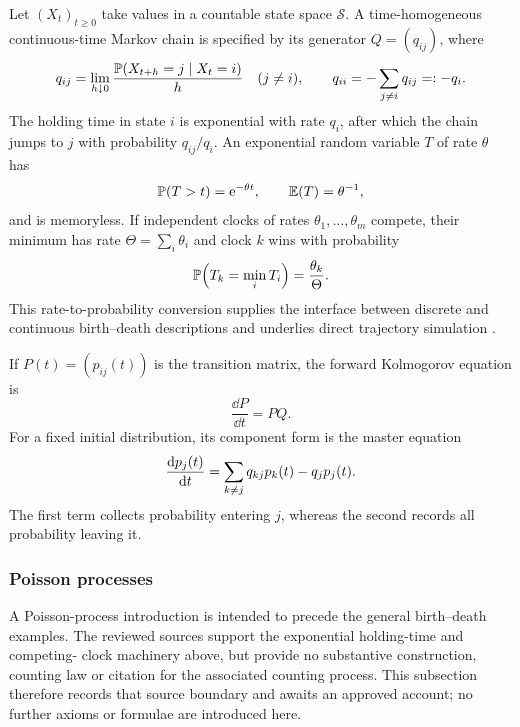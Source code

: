 Let $(X_t)_{t\geq0}$ take values in a countable state space $\mathcal S$.  A
time-homogeneous continuous-time Markov chain is specified by its generator
$Q=(q_{ij})$, where
\begin{equation}
  q_{ij}=\lim_{h\downarrow0}\frac{\mathbb{P}\!\left(X_{t+h}=j\mid X_t=i\right)}{h}
  \quad(j\neq i),\qquad
  q_{ii}=-\sum_{j\neq i}q_{ij}=:-q_i.
  \label{m:eq:generator}
\end{equation}
The holding time in state $i$ is exponential with rate $q_i$, after which the
chain jumps to $j$ with probability $q_{ij}/q_i$.  An exponential random variable
$T$ of rate $\theta$ has
\[
  \mathbb{P}\!\left(T>t\right)=\mathrm{e}^{-\theta t},\qquad \mathbb{E}\!\left(T\right)=\theta^{-1},
\]
and is memoryless.  If independent clocks of rates $\theta_1,\ldots,\theta_m$
compete, their minimum has rate $\Theta=\sum_i\theta_i$ and clock $k$ wins with
probability
\begin{equation}
  \mathbb{P}\!\left(T_k=\min_iT_i\right)=\frac{\theta_k}{\Theta}.
  \label{m:eq:competing-clocks}
\end{equation}
This rate-to-probability conversion supplies the interface between discrete and
continuous birth--death descriptions and underlies direct trajectory simulation
\cite{Gillespie1977}.

If $P(t)=(p_{ij}(t))$ is the transition matrix, the forward Kolmogorov equation is
\begin{equation}
  \frac{\dd P}{\dd t}=P Q.
  \label{m:eq:kolmogorov-forward}
\end{equation}
For a fixed initial distribution, its component form is the master equation
\begin{equation}
  \frac{\mathrm{d} p_j(t)}{\mathrm{d} t}=\sum_{k\neq j}q_{kj}p_k(t)-q_jp_j(t).
  \label{m:eq:master}
\end{equation}
The first term collects probability entering $j$, whereas the second records all
probability leaving it.

\subsubsection{Poisson processes}\label{m:sec:poisson}

A Poisson-process introduction is intended to precede the general birth--death
examples.  The reviewed sources support the exponential holding-time and competing-
clock machinery above, but provide no substantive construction, counting law or
citation for the associated counting process.  This subsection therefore records
that source boundary and awaits an approved account; no further axioms or formulae
are introduced here.

